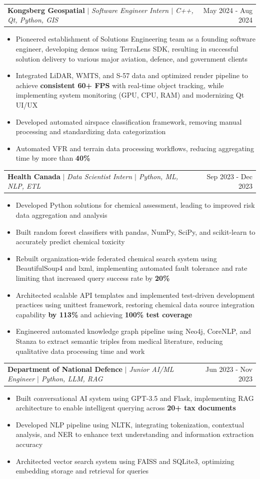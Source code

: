 \documentclass[letterpaper,10pt]{article}
\makeatletter
\newcommand{\resumeItem}[1]{
  \item\small{
    {#1 \vspace{-3.5pt}}
  }
}
\newcommand{\resumeSubheading}[3]{
    \item
    \begin{tabular*}{0.97\textwidth}[t]{l@{\extracolsep{\fill}}r}
      \textbf{#1} $|$ \textit{ #2} & #3 \\
    \end{tabular*}\vspace{-8pt}
}
\newcommand{\resumeItemListStart}{\begin{itemize}}
\newcommand{\resumeItemListEnd}{\end{itemize}\vspace{-5pt}}
\makeatother
\begin{document}
    \resumeSubheading{Kongsberg Geospatial}{Software Engineer Intern $|$ C++, Qt, Python, GIS}{May 2024 - Aug 2024}
      \resumeItemListStart
        \resumeItem{Pioneered establishment of Solutions Engineering team as a founding software engineer, developing demos using TerraLens SDK, resulting in successful solution delivery to various major aviation, defence, and government clients}
        \resumeItem{Integrated LiDAR, WMTS, and S-57 data and optimized render pipeline to achieve \textbf{consistent 60+ FPS} with real-time object tracking, while implementing system monitoring (GPU, CPU, RAM) and modernizing Qt UI/UX}
        \resumeItem{Developed automated airspace classification framework, removing manual processing and standardizing data categorization}
        \resumeItem{Automated VFR and terrain data processing workflows, reducing aggregating time by more than \textbf{40\%}}
      \resumeItemListEnd

    \resumeSubheading{Health Canada}{Data Scientist Intern $|$ Python, ML, NLP, ETL}{Sep 2023 - Dec 2023}
      \resumeItemListStart
        \resumeItem{Developed Python solutions for chemical assessment, leading to improved risk data aggregation and analysis}
        \resumeItem{Built random forest classifiers with pandas, NumPy, SciPy, and scikit-learn to accurately predict chemical toxicity}
        \resumeItem{Rebuilt organization-wide federated chemical search system using BeautifulSoup4 and lxml, implementing automated fault tolerance and rate limiting that increased query success rate by \textbf{20\%}}
        \resumeItem{Architected scalable API templates and implemented test-driven development practices using unittest framework, restoring chemical data source integration capability \textbf{by 113\%} and achieving \textbf{100\% test coverage}}
        \resumeItem{Engineered automated knowledge graph pipeline using Neo4j, CoreNLP, and Stanza to extract semantic triples from medical literature, reducing qualitative data processing time and work}
      \resumeItemListEnd

    \resumeSubheading{Department of National Defence}{Junior AI/ML Engineer $|$ Python, LLM, RAG}{Jun 2023 - Nov 2023}
      \resumeItemListStart
        \resumeItem{Built conversational AI system using GPT-3.5 and Flask, implementing RAG architecture to enable intelligent querying across \textbf{20+ tax documents}}
        \resumeItem{Developed NLP pipeline using NLTK, integrating tokenization, contextual analysis, and NER to enhance text understanding and information extraction accuracy}
        \resumeItem{Architected vector search system using FAISS and SQLite3, optimizing embedding storage and retrieval for queries}
      \resumeItemListEnd
\end{document}
